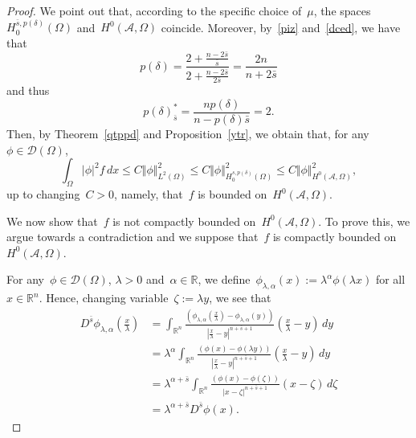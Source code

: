 \documentclass[11pt,hyp,]{nyjm}
\numberwithin{equation}{section}
\newcommand{\R}{\mathbb{R}}
\theoremstyle{remark}
\renewcommand{\leq}{\leqslant}
\begin{document}
\begin{proof}
We point out that, according to the specific choice of~$\mu$, the spaces $H^{\bar{s},p(\delta)}_0(\Omega)$ and~$H^0(\mathcal{A},\Omega)$ coincide.
Moreover, by~\eqref{piz} and~\eqref{dced}, we have that
\begin{equation}\label{nhbb000}
 p(\delta)=\frac{ 2+\frac{n-2\bar{s} }{\bar{s} }}{2+\frac{n-2\bar{s}}{2\bar{s}}}=\frac{2n}{n+2\bar s}
\end{equation} and thus
\begin{equation*}
p(\delta)_{\bar{s}}^* = \frac{n p(\delta)}{n-p(\delta)\bar s}
=2.
\end{equation*}
Then, by Theorem~\ref{qtppd} and Proposition~\ref{ytr}, we obtain that, for any~$\phi \in \mathcal{D}(\Omega)$,
\begin{equation}\label{dbfss}
\int_{\Omega} |\phi|^2 f \,dx\leq C \Vert \phi \Vert_{L^2(\Omega)}^2 \leq C \Vert \phi \Vert^2_{H^{s, p(\delta)}_0(\Omega)} \leq C \Vert \phi \Vert^2_{H^0(\mathcal{A},\Omega)},
\end{equation} up to changing~$C>0$,
namely, that~$f$ is bounded on~$H^0(\mathcal{A},\Omega)$.

{W}e now show that~$f$ is not compactly bounded on~$H^0(\mathcal{A},\Omega)$.
To prove this, we argue towards a contradiction and we suppose that~$f$ is compactly bounded on~$H^0(\mathcal{A},\Omega)$.

For any~$\phi \in \mathcal{D}(\Omega)$, $\lambda>0$ and~$\alpha \in \R$, we define~$\phi_{\lambda, \alpha}(x):= \lambda^{\alpha} \phi(\lambda x)$ for all~$x\in\R^n$.
Hence, changing variable~$\zeta:=\lambda y$, we see that
\begin{equation}\begin{split} \label{xop}
D^{\bar{s}} \phi_{\lambda, \alpha} \left(\frac{x}{\lambda}\right) &= \int_{\R^n} \frac{\left(\phi_{\lambda, \alpha}\left(\frac{x}{\lambda}\right)- \phi_{\lambda, \alpha}(y)\right)}{\left| \frac{x}{\lambda}-y \right|^{n+\bar{s}+1}} \left(\frac{x}{\lambda}-y\right) \, dy \\&= \lambda^{\alpha}\int_{\R^n} \frac{\left(\phi\left(x\right)- \phi(\lambda y)\right)}{\left| \frac{x}{\lambda}-y \right|^{n+\bar{s}+1}} \left(\frac{x}{\lambda}-y\right) \, dy \\&= \lambda^{\alpha+\bar{s}}\int_{\R^n} \frac{\left(\phi\left(x\right)- \phi(\zeta)\right)}{\left|x-\zeta \right|^{n+\bar{s}+1}} \left(x-\zeta\right) \, d\zeta \\& = \lambda^{\alpha+\bar{s}} D^{\bar{s}}  \phi(x).
\end{split}\end{equation}


\end{proof}
\end{document}
